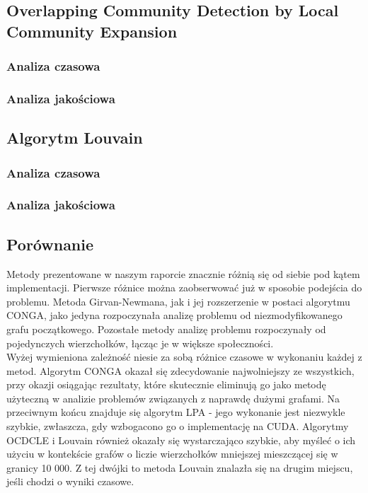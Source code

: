 \documentclass{article}
\begin{document}
\subsection{Overlapping Community Detection by Local Community Expansion}
\subsubsection{Analiza czasowa}
\subsubsection{Analiza jakościowa}

\subsection{Algorytm Louvain}
\subsubsection{Analiza czasowa}
\subsubsection{Analiza jakościowa}

\subsection{Porównanie}
Metody prezentowane w naszym raporcie znacznie różnią się od siebie pod kątem implementacji. Pierwsze różnice można zaobserwować już w sposobie podejścia do problemu. Metoda Girvan-Newmana, jak i jej rozszerzenie w postaci algorytmu CONGA, jako jedyna rozpoczynała analizę problemu od niezmodyfikowanego grafu początkowego. Pozostałe metody analizę problemu rozpoczynały od pojedynczych wierzchołków, łącząc je w większe społeczności. \\

Wyżej wymieniona zależność niesie za sobą różnice czasowe w wykonaniu każdej z metod. Algorytm CONGA okazał się zdecydowanie najwolniejszy ze wszystkich, przy okazji osiągając rezultaty, które skutecznie eliminują go jako metodę użyteczną w analizie problemów związanych z naprawdę dużymi grafami. Na przeciwnym końcu znajduje się algorytm LPA - jego wykonanie jest niezwykle szybkie, zwłaszcza, gdy wzbogacono go o implementację na CUDA. Algorytmy OCDCLE i Louvain również okazały się wystarczająco szybkie, aby myśleć o ich użyciu w kontekście grafów o liczie wierzchołków mniejszej mieszczącej się w granicy 10 000. Z tej dwójki to metoda Louvain znalazła się na drugim miejscu, jeśli chodzi o wyniki czasowe. \\
\end{document}
